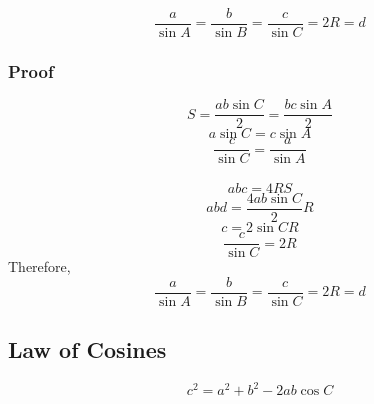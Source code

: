 \documentclass{article}
\begin{document}
$$\frac{a}{\sin A}=\frac{b}{\sin B}=\frac{c}{\sin C}=2R=d$$

\subsubsection{Proof}
$$S=\frac{ab\sin C}{2}=\frac{bc\sin A}{2}$$
$$a\sin C=c\sin A$$
$$\frac{c}{\sin C}=\frac{a}{\sin A}$$\\

$$abc=4RS$$
$$abd=\frac{4ab\sin C}{2}R$$
$$c=2\sin CR$$
$$\frac{c}{\sin C}=2R$$
Therefore, 
$$\frac{a}{\sin A}=\frac{b}{\sin B}=\frac{c}{\sin C}=2R=d$$

\subsection{Law of Cosines}
$$c^2=a^2+b^2-2 a b \cos C $$
\end{document}
